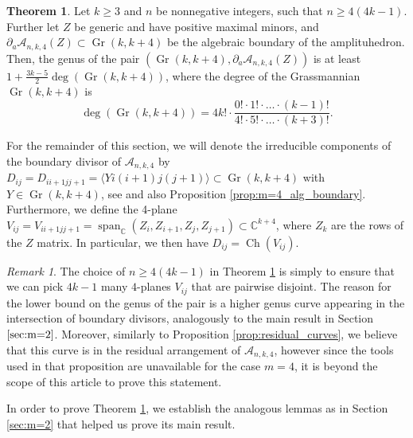 \documentclass[12pt]{extarticle}
\theoremstyle{definition}
\theoremstyle{theorem}
\newtheorem{theorem}[definition]{Theorem}
\theoremstyle{remark}
\newtheorem{remark}[definition]{Remark}
\numberwithin{equation}{section}
\newcommand{\C}{\mathbb{C}}
\DeclareMathOperator{\gr}{Gr}
\newcommand{\aA}{\mathcal{A}}
\newcommand{\CH}{\operatorname{Ch}}
\begin{document}
\begin{theorem}\label{thm:genus_m=4}
    Let $k\geq 3$ and $n$ be nonnegative integers, such that $n\geq 4(4k-1)$.
    Further let $Z$ be generic and have positive maximal minors, 
    and $\partial_a\aA_{n,k,4}(Z)\subset\gr(k,k+4)$ be the algebraic boundary of the amplituhedron.
    Then, the genus of the pair $(\gr(k,k+4),\partial_a\aA_{n,k,4}(Z))$ is at least $1+\frac{3k-5}{2}\deg(\gr(k,k+4))$, where the degree of the Grassmannian $\gr(k,k+4)$ is 
    \[
        \deg(\gr(k,k+4))=4k! \cdot 
        \frac{0! \cdot 1! \cdot \ldots \cdot (k-1)!}{4! \cdot 5! \cdot \ldots \cdot (k+3)!}.
    \]
\end{theorem}

For the remainder of this section, we will denote the irreducible components of the boundary divisor of $\aA_{n,k,4}$ by $D_{ij}=D_{ii+1jj+1}=\langle Y i (i+1)j(j+1)\rangle\subset\gr(k,k+4)$ with $Y\in \gr(k,k+4)$, see \cite{amplituhedronbcfwtriangulation} and also Proposition \ref{prop:m=4_alg_boundary}.
Furthermore, we define the 4-plane $V_{ij}=V_{ii+1jj+1}=\operatorname{span}_{\C}(Z_i,Z_{i+1},Z_j,Z_{j+1})\subset \C^{k+4}$, where $Z_k$ are the rows of the $Z$ matrix. In particular, we then have $D_{ij}=\CH(V_{ij})$.

\begin{remark}
    The choice of $n\geq 4(4k-1)$ in Theorem \ref{thm:genus_m=4} is simply to ensure that we can pick $4k-1$ many $4$-planes $V_{ij}$ that are pairwise disjoint.
    The reason for the lower bound on the genus of the pair is a higher genus curve appearing in the intersection of boundary divisors, analogously to the main result in Section $\ref{sec:m=2}$.
    Moreover, similarly to Proposition \ref{prop:residual_curves}, we believe that this curve is in the residual arrangement of $\aA_{n,k,4}$, however since the tools used in that proposition are unavailable for the case $m=4$, it is beyond the scope of this article to prove this statement.
\end{remark}

In order to prove Theorem \ref{thm:genus_m=4}, we establish the analogous lemmas as in Section \ref{sec:m=2} that helped us prove its main result.
\end{document}
